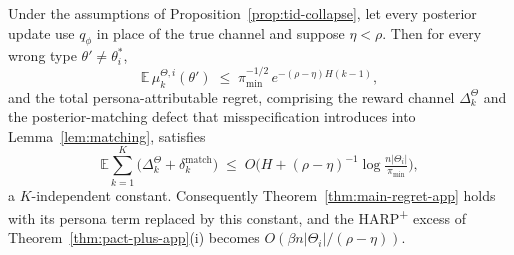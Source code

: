 \begin{proposition}
\label{prop:misspec-contraction}
Under the assumptions of Proposition~\ref{prop:tid-collapse}, let every posterior update use $q_\phi$ in place of the true channel and suppose $\eta<\rho$. Then for every wrong type $\theta'\neq\theta_i^*$,
\begin{equation*}
\mathbb{E}\,\mu_k^{\Theta,i}(\theta') \;\le\; \pi_{\min}^{-1/2}\, e^{-(\rho-\eta)H(k-1)},
\end{equation*}
and the total persona-attributable regret, comprising the reward channel $\Delta_k^\Theta$ and the posterior-matching defect that misspecification introduces into Lemma~\ref{lem:matching}, satisfies
\begin{equation*}
\mathbb{E}\sum_{k=1}^K \big(\Delta_k^\Theta + \delta_k^{\mathrm{match}}\big) \;\le\; O\Big(H+(\rho-\eta)^{-1}\log\tfrac{n|\Theta_i|}{\pi_{\min}}\Big),
\end{equation*}
a $K$-independent constant. Consequently Theorem~\ref{thm:main-regret-app} holds with its persona term replaced by this constant, and the HARP\textsuperscript{+} excess of Theorem~\ref{thm:pact-plus-app}(i) becomes $O(\beta n|\Theta_i|/(\rho-\eta))$.
\end{proposition}


